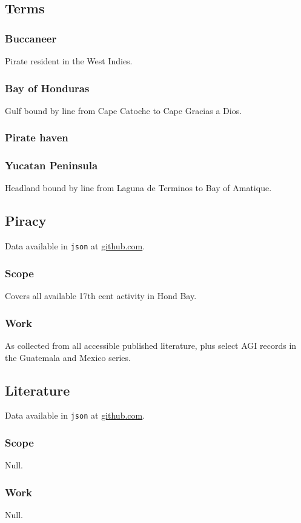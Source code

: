 \documentclass{amsart}
\newcommand{\code}[1]{\texttt{#1}}%
\theoremstyle{definition}%
\theoremstyle{definition}%
\begin{document}
\subsection{Terms}%
\label{ss:terms}
\subsubsection{Buccaneer} Pirate resident in the West Indies.
\subsubsection{Bay of Honduras} Gulf bound by line from Cape Catoche to Cape Gracias a Dios.
\subsubsection{Pirate haven}
\subsubsection{Yucatan Peninsula} Headland bound by line from Laguna de Terminos to Bay of Amatique.
%
%
%
%
\subsection{Piracy}%
\label{ss:piracy}
Data available in \code{json} at \href{http://github.com/aenavidad/pp-0}{github.com}.
\subsubsection{Scope} Covers all available 17th cent activity in Hond Bay.
\subsubsection{Work} As collected from all accessible published literature, plus select AGI records in the Guatemala and Mexico series.
%
%
%
%
\subsection{Literature}%
\label{ss:literature}
Data available in \code{json} at \href{http://github.com/aenavidad/pp-0}{github.com}.
\subsubsection{Scope} Null.
\subsubsection{Work} Null.
%
%
%
%
\end{document}
